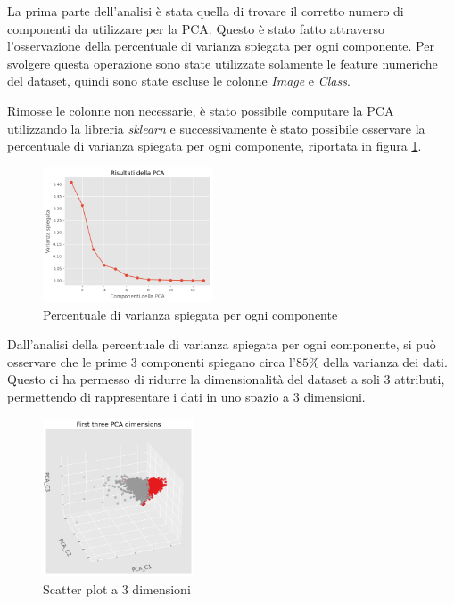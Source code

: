 La prima parte dell'analisi è stata quella di trovare il corretto numero di
componenti da utilizzare per la PCA. Questo è stato fatto attraverso
l'osservazione della percentuale di varianza spiegata per ogni componente. Per
svolgere questa operazione sono state utilizzate solamente le feature numeriche
del dataset, quindi sono state escluse le colonne \textit{Image} e \textit{Class}.

Rimosse le colonne non necessarie, è stato possibile computare la PCA utilizzando
la libreria \textit{sklearn} e successivamente è stato possibile osservare la
percentuale di varianza spiegata per ogni componente, riportata in figura \ref{fig:pca}.

\begin{figure}[!ht]
      \centering
      \includegraphics[width=0.45\textwidth]{img/analisi/pcaVarianza.png}
      \caption{Percentuale di varianza spiegata per ogni componente}
      \label{fig:pca}
\end{figure}

Dall'analisi della percentuale di varianza spiegata per ogni componente, si può
osservare che le prime $3$ componenti spiegano circa l'$85\%$ della varianza
dei dati. Questo ci ha permesso di ridurre la dimensionalità del dataset a soli
$3$ attributi, permettendo di rappresentare i dati in uno spazio a $3$ dimensioni.

\begin{figure}[!ht]
      \centering
      \includegraphics[width=0.4\textwidth]{img/analisi/pcaNuovoDataset.png}
      \caption{Scatter plot a 3 dimensioni}
      \label{fig:pca-3d}
\end{figure}

